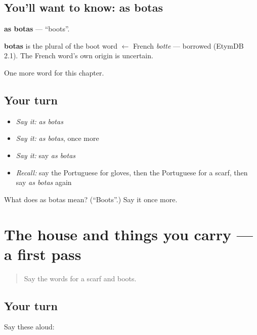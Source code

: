 \subsection*{You'll want to know: as botas}
\textbf{as botas} — \textquotedblleft{}boots\textquotedblright{}.

\begin{cousinweb}
\textbf{botas} is the plural of the boot word $\leftarrow$ French \emph{botte} — borrowed (EtymDB 2.1). The French word's own origin is uncertain.
\end{cousinweb}

\begin{grammarlens}[title={What you've built}]
One more word for this chapter.
\end{grammarlens}

\subsection*{Your turn}
\begin{itemize}
\raggedright
  \item \emph{Say it:} \emph{as botas}
  \item \emph{Say it:} \emph{as botas}, once more
  \item \emph{Say it:} say \emph{as botas}
  \item \emph{Recall:} say the Portuguese for gloves, then the Portuguese for a scarf, then say \emph{as botas} again
\end{itemize}

\begin{tcolorbox}[breakable,colback=teal!4,colframe=teal!35!black,title={Before you move on}]
What does as botas mean? (\textquotedblleft{}Boots\textquotedblright{}.) Say it once more.
\end{tcolorbox}
\section[(dialogue)]{The house and things you carry — a first pass}

\label{lesson:PT-R103-first-pass-the-house-and-things-you-carry}



\begin{quote}
Say the words for a scarf and boots.
\end{quote}

\subsection*{Your turn}
Say these aloud:

